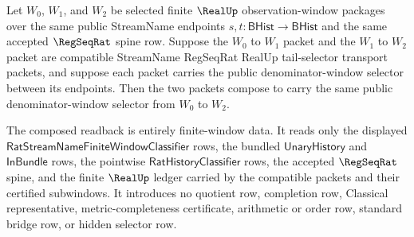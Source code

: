 \begin{theorem}
\label{thm:streamname-regseqrat-realup-tail-denominator-selector-composition}
Let $W_0$, $W_1$, and $W_2$ be selected finite $\RealUp$ observation-window
packages over the same public StreamName endpoints $s,t:\mathsf{BHist}\to
\mathsf{BHist}$ and the same accepted $\RegSeqRat$ spine row. Suppose the
$W_0$ to $W_1$ packet and the $W_1$ to $W_2$ packet are compatible StreamName
RegSeqRat RealUp tail-selector transport packets, and suppose each packet
carries the public denominator-window selector between its endpoints. Then the
two packets compose to carry the same public denominator-window selector from
$W_0$ to $W_2$.

The composed readback is entirely finite-window data. It reads only the
displayed $\mathsf{RatStreamNameFiniteWindowClassifier}$ rows, the bundled
$\mathsf{UnaryHistory}$ and $\mathsf{InBundle}$ rows, the pointwise
$\mathsf{RatHistoryClassifier}$ rows, the accepted $\RegSeqRat$ spine, and the
finite $\RealUp$ ledger carried by the compatible packets and their certified
subwindows. It introduces no quotient row, completion row, Classical
representative, metric-completeness certificate, arithmetic or order row,
standard bridge row, or hidden selector row.
\end{theorem}
